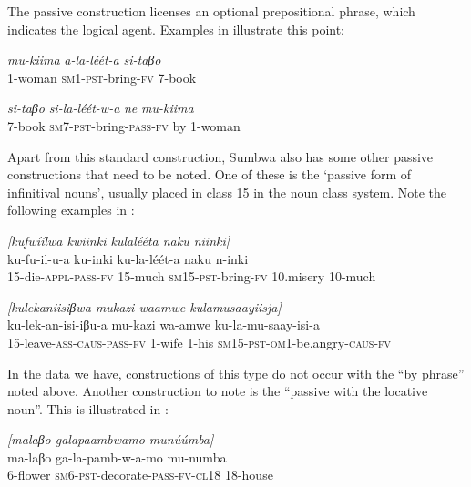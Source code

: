 \documentclass[output=paper		  ]{langscibook}
\begin{document}
{The passive construction licenses an optional prepositional phrase, which indicates the logical agent.  Examples in  illustrate this point:}

\ea\label{ex:kahigi:3}
    \ea\label{ex:kahigi:3a} \gll \textit{mu-kiima}   \textit{a-la-léét-a}           \textit{si-taβo}\\
 1-woman     \textsc{sm1-pst-}bring-\textsc{fv}    7-book\\

    \ex\label{ex:kahigi:3b} \gll \textit{si-taβo}    \textit{si-la-léét-w-a}             \textit{ne}    \textit{mu-kiima}\\
7-book       \textsc{sm7-pst-}bring-\textsc{pass-fv}  by    1-woman\\
    \z
\z

Apart from this standard construction, Sumbwa also has some other passive constructions that need to be noted. One of these is the ‘passive form of infinitival nouns’, usually placed in class 15 in the noun class system. Note the following examples in :

\ea\label{ex:kahigi:4}
    \ea\label{ex:kahigi:4a} \textit{[kufwíílwa kwiinki kulalééta naku niinki]}\\
\gll ku-fu-il-u-a           ku-inki     ku-la-léét-a             naku       n-inki\\
15-die-\textsc{appl-pass-fv}   15-much  \textsc{sm15-pst-}bring-\textsc{fv}    10.misery   10-much\\

    \ex\label{ex:kahigi:4b} \textit{[kulekaniisiβwa mukazi waamwe kulamusaayiisja]}\\
\gll ku-lek-an-isi-iβu-a              mu-kazi   wa-amwe ku-la-mu-saay-isi-a\\
15-leave-\textsc{ass-caus-pass-fv}   1-wife   1-his \textsc{sm15-pst-om1-}be.angry-\textsc{caus-fv}\\
    \z
\z

{In the data we have, constructions of this type do not occur with the ``by phrase'' noted above. Another construction to note is the ``passive with the locative noun''.  This is illustrated in :}

\ea\label{ex:kahigi:5}    
    \ea\label{ex:kahigi:5a} \textit{[malaβo galapaambwamo munúúmba]}\\
\gll ma-laβo     ga-la-pamb-w-a-mo              mu-numba\\
 6-flower   \textsc{sm6-pst-}decorate-\textsc{pass-fv-cl18}   18-house\\
\end{document}
